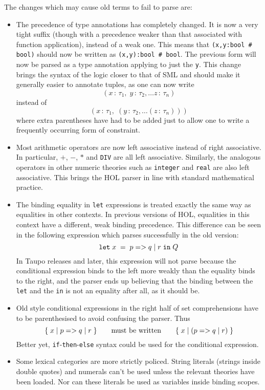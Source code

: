 The changes which may cause old terms to fail to parse are:
\begin{itemize}
\newcommand\condexp{\mbox{$p \; {\tt =>} \; q \; {\tt |} \; r$}}
\item The precedence of type annotations has completely changed.  It
  is now a very tight suffix (though with a precedence weaker than
  that associated with function application), instead of a weak one.
  This means that \mbox{\tt (x,y:bool \# bool)} should now be written
  as \mbox{\tt (x,y):bool \# bool}. The previous form will now be
  parsed as a type annotation applying to just the \verb+y+.  This
  change brings the syntax of the logic closer to that of SML and
  should make it generally easier to annotate tuples, as one can now
  write \[ (x\,:\,\tau_1,\;y\,:\,\tau_2,\dots z\,:\,\tau_n)
  \] instead of \[
  (x\,:\,\tau_1, \;(y\,:\,\tau_2, \dots (z\,:\,\tau_n)))
  \] where extra parentheses have had to be added just to allow one to
  write a frequently occurring form of constraint.
\item Most arithmetic operators are now left associative instead of
  right associative.  In particular, $+$, $-$, $*$ and {\tt DIV} are
  all left associative.  Similarly, the analogous operators in other
  numeric theories such as {\tt integer} and {\tt real} are also left
  associative.  This brings the HOL parser in line with standard
  mathematical practice.
\item The binding equality in {\tt let} expressions is treated exactly
  the same way as equalities in other contexts.  In previous versions
  of HOL, equalities in this context have a different, weak binding
  precedence.  This difference can be seen in the following expression
  which parses successfully in the old version:
  \[ {\tt let} \; x \; = \; \condexp \; {\tt
  in} \;Q \] In Taupo releases and later, this expression will not
  parse because the conditional expression binds to the left more
  weakly than the equality binds to the right, and the parser ends up
  believing that the binding between the \verb+let+ and the \verb+in+
  is not an equality after all, as it should be.
\item Old style conditional expressions in the right half of set
  comprehensions have to be parenthesised to avoid confusing the
  parser.  Thus \[
  \{ \; x \; | \; \condexp \; \}
   \qquad\mbox{must be written} \qquad
  \{ \; x \; | \; (\condexp) \; \}
  \] Better yet, {\tt if}-{\tt then}-{\tt else} syntax could be used
  for the conditional expression.
\item Some lexical categories are more strictly policed.  String
  literals (strings inside double quotes) and numerals can't be used
  unless the relevant theories have been loaded.  Nor can these
  literals be used as variables inside binding scopes.
\end{itemize}


